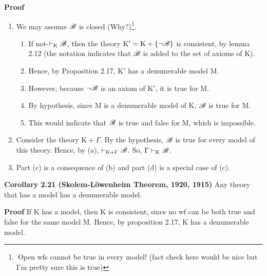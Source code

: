\textbf{Proof}
\begin{enumerate} [label = \alph*.]
    \item We may assume $\mathscr{B}$ is closed (Why?)\footnote{$\ $Open wfs cannot be true in every model! (fact check here would be nice but I'm pretty sure this is true)}.
    \begin{enumerate} [label = \roman*.]
        \item If not-$\vdash_\text{K} \mathscr{B}$, then the theory K$' = \text{K} +\{\lnot \mathscr{B} \}$ is consistent, by lemma 2.12 (the notation indicates that $\mathscr{B}$ is added to the set of axioms of K).
        \item Hence, by Proposition 2.17, K$'$ has a denumerable model M.
        \item However, because $\lnot \mathscr{B}$ is an axiom of K$'$, it is true for M.
        \item By hypothesis, since M is a denumerable model of K, $\mathscr{B}$ is true for M.
        \item This would indicate that $\mathscr{B}$ is true and false for M, which is impossible.
    \end{enumerate}
    \item Consider the theory $\text{K} + \Gamma$. By the hypothesis, $\mathscr{B}$ is true for every model of this theory. Hence, by (a), $\vdash_{\text{K}+\Gamma} \mathscr{B}$. So, $\Gamma \vdash_\text{K} \mathscr{B}$.
    \item Part (c) is a consequence of (b) and part (d) is a special case of (c).
\end{enumerate} 

\textbf{Corollary 2.21 (Skolem-L\"{o}wenheim Theorem, 1920, 1915)}
Any theory that has a model has a denumerable model. 

\textbf{Proof}
If K has a model, then K is consistent, since no wf can be both true and false for the same model M. Hence, by proposition 2.17, K has a denumerable model. 
